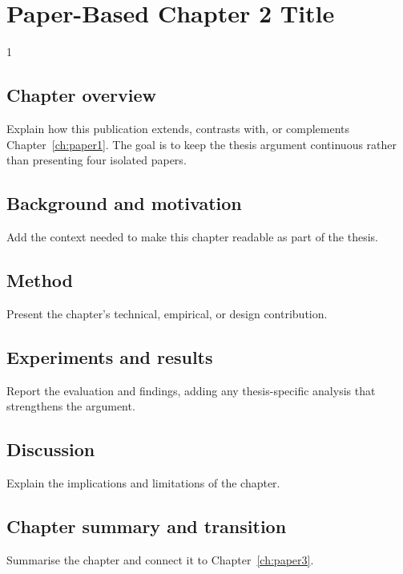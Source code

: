 \doublespacing %

\chapter{Paper-Based Chapter 2 Title}
\label{ch:paper2}

\begin{spacing}{1} %
\minitoc %
\end{spacing} %
\thesisspacing %


\section{Chapter overview}

Explain how this publication extends, contrasts with, or complements Chapter~\ref{ch:paper1}. The goal is to keep the thesis argument continuous rather than presenting four isolated papers.

\section{Background and motivation}

Add the context needed to make this chapter readable as part of the thesis.

\section{Method}

Present the chapter's technical, empirical, or design contribution.

\section{Experiments and results}

Report the evaluation and findings, adding any thesis-specific analysis that strengthens the argument.

\section{Discussion}

Explain the implications and limitations of the chapter.

\section{Chapter summary and transition}

Summarise the chapter and connect it to Chapter~\ref{ch:paper3}.
